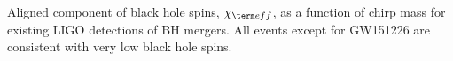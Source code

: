  \label{fig:BHspin} Aligned component of black hole spins, $\chi_{\term eff}$, as a function of chirp mass for existing LIGO detections of BH mergers. All events except for GW151226 are consistent with very low black hole spins.